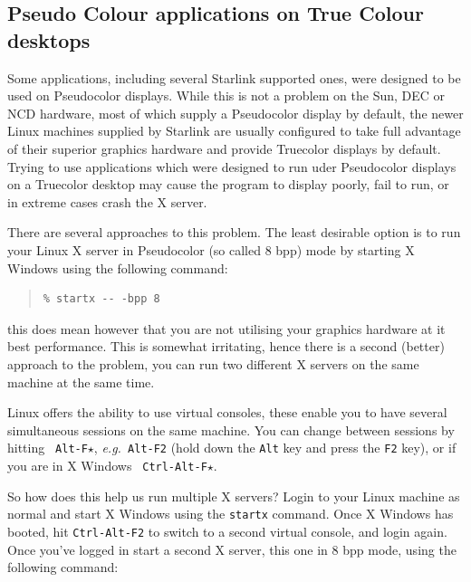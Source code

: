 \documentclass[twoside,11pt]{article}
\newcommand{\htmladdnormallink}[2]{#1}
\newcommand{\xlabel}[1]{}
\begin{document}
\subsection{\xlabel{sc15_pseudoontrue}Pseudo Colour applications on
True Colour desktops\label{sc15_pseudoontrue}}

Some applications, including several Starlink supported ones, were
designed to be used on Pseudocolor displays. While this is not a
problem on the Sun, DEC or NCD hardware, most of which supply a
Pseudocolor display by default, the newer Linux machines supplied by
Starlink are usually configured to take full advantage of their
superior graphics hardware and provide Truecolor displays by default.
Trying to use applications which were designed to run uder Pseudocolor
displays on a Truecolor desktop may cause the program to display
poorly, fail to run, or in extreme cases crash the X server.

There are several approaches to this problem. The least desirable
option is to run your Linux X server in Pseudocolor (so called 8 bpp)
mode by starting X Windows using the following command:

\small
\begin{quote}
\begin{verbatim}
% startx -- -bpp 8
\end{verbatim}
\end{quote}
\normalsize

this does mean however that you are not utilising your graphics
hardware at it best performance. This is somewhat irritating, hence
there is a second (better) approach to the problem, you can run two
different X servers on the same machine at the same time.

Linux offers the ability to use \htmladdnormallink{virtual
consoles}{http://www.linuxdoc.org/HOWTO/Keyboard-and-Console-HOWTO-7.html},
these enable you to have several simultaneous sessions on the same
machine. You can change between sessions by hitting {\tt
Alt-F$\star$}, {\em e.g.\ }{\tt Alt-F2} (hold down the {\tt Alt} key
and press the {\tt F2} key), or if you are in X Windows {\tt
Ctrl-Alt-F$\star$}.

So how does this help us run multiple X servers? Login to your Linux
machine as normal and start X Windows using the {\tt startx} command.
Once X Windows has booted, hit {\tt Ctrl-Alt-F2} to switch to a second
virtual console, and login again. Once you've logged in start a second
X server, this one in 8 bpp mode, using the following command:
\end{document}
